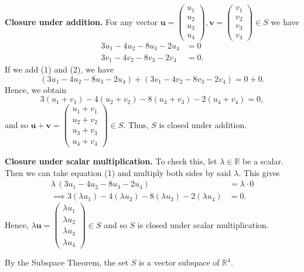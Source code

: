 \documentclass{article}
\begin{document}
\textbf{Closure under addition.}
For any vector $\mathbf{u} = 
\begin{pmatrix}
  u_1\\
  u_2\\
  u_3\\
  u_4
\end{pmatrix}, 
\mathbf{v} =
\begin{pmatrix}
  v_1\\
  v_2\\
  v_3\\
  v_4
\end{pmatrix} 
\in S$ 
we have 
\begin{align*}
  3u_1 - 4u_2 - 8u_3 - 2u_4 &= 0  \tag{1} \\
  3v_1 - 4v_2 - 8v_3 - 2v_4 &= 0. \tag{2}
\end{align*}
If we add (1) and (2), we have 
\begin{equation*}
  (3u_1 - 4u_2 - 8u_3 - 2u_4 )+ (3v_1 - 4v_2 - 8v_3 - 2v_4) = 0 + 0.
\end{equation*}
Hence, we obtain 
\begin{equation*}
  3(u_1 + v_1) - 4(u_2 + v_2) - 8(u_3 + v_3) - 2(u_4 + v_4) = 0,
\end{equation*}
and so $\mathbf{u} + \mathbf{v} = 
\begin{pmatrix}
  u_1 + v_1\\
  u_2 + v_2\\
  u_3 + v_3\\
  u_4 + v_4
\end{pmatrix}
\in S.$
Thus, $S$ is closed under addition. 

\textbf{Closure under scalar multiplication.} To check this, let $\lambda \in \mathbb{R}$ be a scalar.
Then we can take equation (1) and multiply both sides by said $\lambda$. This gives
\begin{align*}
\lambda\,(3u_1 - 4u_2 - 8u_3 - 2u_4) &= \lambda\cdot 0 \\
\implies
3(\lambda u_1) - 4(\lambda u_2) - 8(\lambda u_3) - 2(\lambda u_4) &= 0.
\end{align*}
Hence, $\lambda \mathbf{u} = 
\begin{pmatrix}
  \lambda u_1\\
  \lambda u_2\\
  \lambda u_3\\
  \lambda u_4
\end{pmatrix}
\in S$
and so $S$ is closed under scalar multiplication.

By the Subspace Theorem, the set $S$ is a vector subspace of $\mathbb{R}^4$.
\newpage
\end{document}

